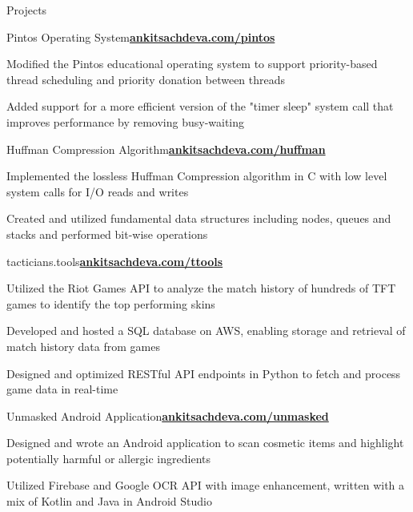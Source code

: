 \documentclass{resume}
\begin{document}
\begin{rSection}{\large Projects}

\begin{rSubsection}{Pintos Operating System}{\href{http://ankitsachdeva.com/pintos/}{\bf{{ankitsachdeva.com/pintos}}}}{}{}
\item Modified the Pintos educational operating system to support priority-based thread scheduling and priority donation between threads
\item Added support for a more efficient version of the "timer sleep" system call that improves performance by removing busy-waiting
\end{rSubsection}

\begin{rSubsection}{Huffman Compression Algorithm}{\href{https://ankitsachdeva.com/huffman/}{\bf{{ankitsachdeva.com/huffman}}}}{}{}
\item Implemented the lossless Huffman Compression algorithm in C with low level system calls for I/O reads and writes
\item Created and utilized fundamental data structures including nodes, queues and stacks and performed bit-wise operations
\end{rSubsection}

\begin{rSubsection}{tacticians.tools}{\href{https://tacticians.tools/}{\bf{{ankitsachdeva.com/ttools}}}}{}{}
\item Utilized the Riot Games API to analyze the match history of hundreds of TFT games to identify the top performing skins
\item Developed and hosted a SQL database on AWS, enabling storage and retrieval of match history data from games
\item Designed and optimized RESTful API endpoints in Python to fetch and process game data in real-time
\end{rSubsection}

\begin{rSubsection}{Unmasked Android Application}{\href{https://ankitsachdeva.com/unmasked}{\bf{{ankitsachdeva.com/unmasked}}}}{}{}
\item Designed and wrote an Android application to scan cosmetic items and highlight potentially harmful or allergic ingredients
\item Utilized Firebase and Google OCR API with image enhancement, written with a mix of Kotlin and Java in Android Studio
\end{rSubsection}


\end{rSection}
\end{document}
